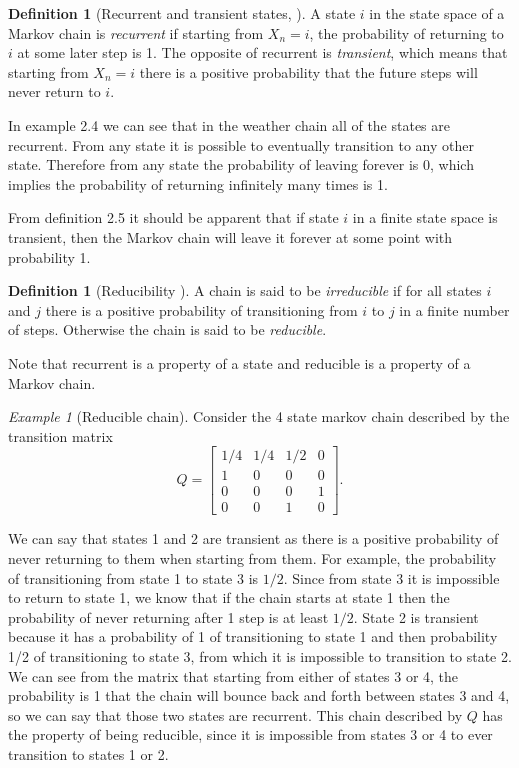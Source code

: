 \documentclass[11pt]{amsart}
\theoremstyle{theorem} %
\theoremstyle{definition}                  %
\newtheorem{defn}[thm]{Definition}
\theoremstyle{example}                       %
\theoremstyle{remark}                       %
\newtheorem{exmp}[thm]{Example}  %
\numberwithin{equation}{section}
\begin{document}
\begin{defn}[{Recurrent and transient states, \cite[p.~465]{blitzstein}}]

    A state $i$ in the state space of a Markov chain is \emph{recurrent} if starting from $X_n=i$, the probability of returning to $i$ at some later step is 1. The opposite of recurrent is \emph{transient}, which means that starting from $X_n=i$ there is a positive probability that the future steps will never return to $i$.
    
\end{defn}

In example 2.4 we can see that in the weather chain all of the states are recurrent. From any state it is possible to eventually transition to any other state. Therefore from any state the probability of leaving forever is 0, which implies the probability of returning infinitely many times is 1.

From definition 2.5 it should be apparent that if state $i$ in a finite state space is transient, then the Markov chain will leave it forever at some point with probability 1.

\begin{defn}[{Reducibility \cite[p.~466]{blitzstein}}]
    A chain is said to be \emph{irreducible} if for all states $i$ and $j$ there is a positive probability of transitioning from $i$ to $j$ in a finite number of steps. Otherwise the chain is said to be \emph{reducible}.
\end{defn}

Note that recurrent is a property of a state and reducible is a property of a Markov chain.

\begin{exmp}[Reducible chain]
    Consider the 4 state markov chain described by the transition matrix
    \[Q=\begin{bmatrix} 1/4&1/4&1/2&0\\1&0&0&0\\0&0&0&1\\0&0&1&0\end{bmatrix}.\]
    
    We can say that states 1 and 2 are transient as there is a positive probability of never returning to them when starting from them. For example, the probability of transitioning from state 1 to state 3 is $1/2$. Since from state 3 it is impossible to return to state 1, we know that if the chain starts at state 1 then the probability of never returning after 1 step is at least $1/2$. State 2 is transient because it has a probability of 1 of transitioning to state 1 and then probability 1/2 of transitioning to state 3, from which it is impossible to transition to state 2. We can see from the matrix that starting from either of states 3 or 4, the probability is 1 that the chain will bounce back and forth between states 3 and 4, so we can say that those two states are recurrent. This chain described by $Q$ has the property of being reducible, since it is impossible from states 3 or 4 to ever transition to states 1 or 2. 
\end{exmp}
\end{document}
